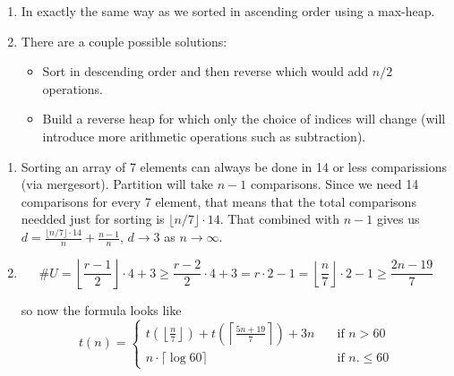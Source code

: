 \documentclass{article}
\begin{document}
\begin{tasks}
{\begin{enumerate}[label={(\arabic*)}]
{\begin{verbatim}
A(h) = min{ A(i), A(1), A(I) }
h = i: done
h != i: swap(A(i), A(h))
if h leaf { done } else
{ heapify(A, h) } \end{verbatim}
                }
                \item {
                    In exactly the same way as we sorted in ascending order using a max-heap.
                }
                \item {
                    There are a couple possible solutions:
                    \begin{itemize}
                        \item Sort in descending order and then reverse which would add \(n / 2\) operations.
                        \item Build a reverse heap for which only the choice of indices will change (will introduce more arithmetic operations such as subtraction).
                    \end{itemize}
                }
            \end{enumerate}
        }
        \item {
            \begin{enumerate}[label={(\arabic*)}]
                \item {
                    Sorting an array of 7 elements can always be done in 14 or less comparissions (via mergesort).
                    Partition will take \(n-1\) comparisons. Since we need 14 comparisons for every 7 element, that means
                    that the total comparisons needded just for sorting is \(\lfloor n/7\rfloor\cdot14\). That combined with
                    \(n-1\) gives us \(d = \frac{\lfloor n/7\rfloor\cdot14}{n} + \frac{n - 1}{n}\), \(d \to 3\) as \(n \to \infty\).
                }
                \item {
                    \begin{displaymath}
                        \#U 
                        = \left\lfloor\frac{r-1}{2}\right\rfloor\cdot4+3
                        \geq \frac{r-2}{2} \cdot 4 + 3
                        = r\cdot2 - 1
                        = \left\lfloor \frac{n}{7} \right\rfloor\cdot2 - 1
                        \geq \frac{2n - 19}{7}
                    \end{displaymath}

                    so now the formula looks like
                    \begin{displaymath}
                        t(n) = \begin{cases}
                            t\left(\left\lfloor\frac{n}{7}\right\rfloor\right) + t\left(\left\lceil\frac{5n+19}{7}\right\rceil\right) + 3n \quad & \text{if } n > 60 \\
                            n\cdot\lceil\log60\rceil & \text{if } n. \leq 60
                        \end{cases}
                    \end{displaymath}

}
\end{enumerate}}
\end{tasks}
\end{document}
